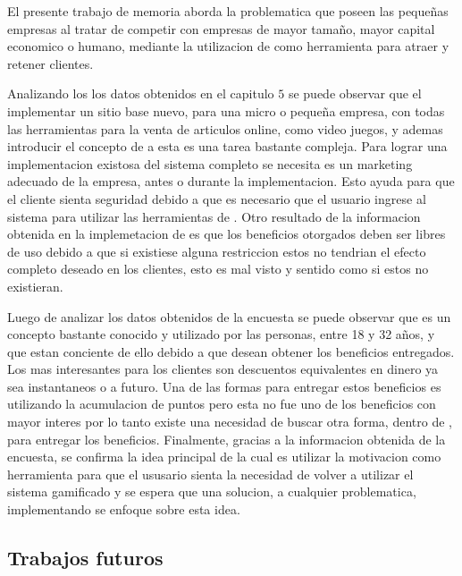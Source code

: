 El presente trabajo de memoria aborda la problematica que poseen las pequeñas empresas al tratar
de competir con empresas de mayor tamaño, mayor capital economico o humano, mediante la utilizacion
de {\GAM} como herramienta para atraer y retener clientes.

Analizando los los datos obtenidos en el capitulo $5$ se puede observar que el implementar un sitio base 
nuevo, para una micro o pequeña empresa, con todas las herramientas para la venta de articulos online, 
como video juegos, y ademas introducir el concepto de {\GAM} a esta es una tarea bastante compleja. 
Para lograr una implementacion existosa del sistema completo se necesita es un marketing adecuado 
de la empresa, antes o durante la implementacion. Esto ayuda para que el cliente sienta seguridad
debido a que es necesario que el usuario ingrese al sistema para utilizar las herramientas de {\GAM}.
Otro resultado de la informacion obtenida en la implemetacion de {\GAM} es que los beneficios otorgados
deben ser libres de uso debido a que si existiese alguna restriccion estos no tendrian el efecto completo
deseado en los clientes, esto es mal visto y sentido como si estos no existieran.     

Luego de analizar los datos obtenidos de la encuesta se puede observar que {\GAM} es un concepto bastante
conocido y utilizado por las personas, entre 18 y 32 años, y que estan conciente de ello debido a que
desean obtener los beneficios entregados. Los mas interesantes para los clientes son descuentos equivalentes
en dinero ya sea instantaneos o a futuro. Una de las formas para entregar estos beneficios es utilizando la 
acumulacion de puntos pero esta no fue uno de los beneficios con mayor interes por lo tanto existe una
necesidad de buscar otra forma, dentro de {\GAM}, para entregar los beneficios.
Finalmente, gracias a la informacion obtenida de la encuesta, se confirma la idea principal de {\GAM} la
cual es utilizar la motivacion como herramienta para que el ususario sienta la necesidad de volver
a utilizar el sistema gamificado y se espera que una solucion, a cualquier problematica, implementando 
{\GAM} se enfoque sobre esta idea.

\subsection{Trabajos futuros}

